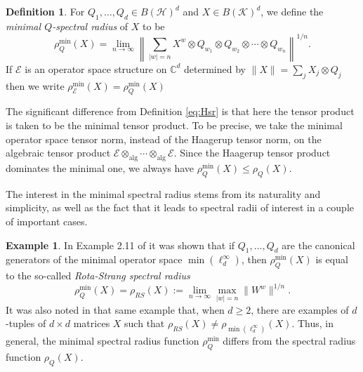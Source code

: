 \documentclass[12pt]{amsart}
\numberwithin{equation}{section}
\theoremstyle{definition}
\newtheorem{example}[theorem]{Example}
\newtheorem{definition}[theorem]{Definition}
\newcommand{\cE}{\mathcal{E}}
\newcommand{\cH}{\mathcal{H}}
\newcommand{\cK}{\mathcal{K}}
\newcommand{\bC}{\mathbb{C}}
\begin{document}
\begin{definition}\label{def:min_spectral_rad}
For $Q_1, \ldots, Q_d \in B(\cH)^d$ and $X \in B(\cK)^d$, we define the {\em minimal $Q$-spectral radius} of $X$ to be
\begin{equation}\label{eq:spectral_radius_formula}
\rho^{\min}_Q(X) = \lim_{n \to \infty} \left \|\sum_{|w|=n} X^w \otimes Q_{w_1} \otimes Q_{w_2} \otimes \cdots \otimes Q_{w_n} \right\|^{1/n} . 
\end{equation}
If $\cE$ is an operator space structure on $\bC^d$ determined by $\|X\| = \sum_j X_j \otimes Q_j$ then we write $\rho^{\min}_\cE(X) = \rho^{\min}_Q(X)$
\end{definition}
The significant difference from Definition \eqref{eq:Hsr} is that here the tensor product is taken to be the minimal tensor product. 
To be precise, we take the minimal operator space tensor norm, instead of the Haagerup tensor norm, on the algebraic tensor product $\cE \otimes_{\operatorname{alg}} \cdots \otimes_{\operatorname{alg}} \cE$. 
Since the Haagerup tensor product dominates the minimal one, we always have $\rho_Q^{\min}(X) \leq \rho_Q(X)$. 

The interest in the minimal spectral radius stems from its naturality and simplicity, as well as the fact that it leads to spectral radii of interest in a couple of important cases. 

\begin{example}\label{ex:specrad_min_ellinf}
In Example 2.11 of \cite{shalsham2025spectral} it was shown that  if $Q_1, \ldots, Q_d$ are the canonical generators of the minimal operator space $\min(\ell^\infty_d)$, then $\rho^{\min}_Q(X)$ is equal to the so-called {\em Rota-Strang spectral radius}
\[
\rho^{\min}_Q(X) = \rho_{RS}(X) := \lim_{n \to \infty} \max_{|w|=n}\|W^w\|^{1/n}. 
\]
It was also noted in that same example that, when $d\geq2$, there are examples of $d$-tuples of $d \times d$ matrices $X$ such that $\rho_{RS}(X) \neq \rho_{\min(\ell^\infty_d)}(X)$.
Thus, in general, the minimal spectral radius function $\rho^{\min}_Q$ differs from the spectral radius function $\rho_Q(X)$. 
\end{example}
\end{document}
